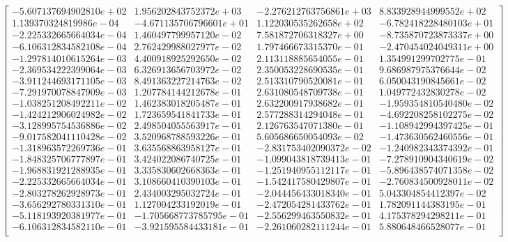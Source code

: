 \documentclass{article}
\begin{document}
$$
\begin{bmatrix} 
-5.607137694902810e+02 & 1.956202843752372e+03 & -2.276212763756861e+03 & 8.833928944999552e+02 \\
1.139370324819986e-04 & -4.671135706796601e+01 & 1.122030535262658e+02 & -6.782418228480103e+01 \\
-2.225332665664034e-04 & 1.460497799957120e-02 & 7.581872706318327e+00 & -8.735870723873337e+00 \\
-6.106312834582108e-04 & 2.762429988027977e-02 & 1.797466673315370e-01 & -2.470454024049311e+00 \\
-1.297814010615264e-03 & 4.400918925292650e-02 & 2.113118885654055e-01 & 1.354991299702775e-01 \\
-2.369534222399064e-03 & 6.326913656703972e-02 & 2.350053228690535e-01 & 9.686987975376644e-02 \\
-3.911244693171105e-03 & 8.491363227214763e-02 & 2.513310790520081e-01 & 6.050043190845661e-02 \\
-7.291970078847909e-03 & 1.207784144212678e-01 & 2.631080548709738e-01 & 1.049772432830278e-02 \\
-1.038251208492211e-02 & 1.462383018205487e-01 & 2.632200917938682e-01 & -1.959354810540480e-02 \\
-1.424212906024982e-02 & 1.723659541841733e-01 & 2.577288314294048e-01 & -4.692208258102275e-02 \\
-3.128995754536886e-02 & 2.498504055563917e-01 & 2.126763547071380e-01 & -1.108942994397425e-01 \\
-9.017582041110428e-02 & 3.520968788593226e-01 & 5.605686650054093e-02 & -1.473630562460556e-01 \\
-1.318963572269736e-01 & 3.635568863958127e-01 & -2.831753402090372e-02 & -1.240982343374392e-01 \\
-1.848325706777897e-01 & 3.424022086740725e-01 & -1.099043818739413e-01 & -7.278910904340619e-02 \\
-1.968831921288935e-01 & 3.335830602668363e-01 & -1.251940955112117e-01 & -5.896438574071358e-02 \\
-2.225332665664034e-01 & 3.108660410390103e-01 & -1.542417580429807e-01 & -2.760834500928011e-02 \\
-2.803278262928973e-01 & 2.434003295032724e-01 & -2.044456433018340e-01 & 5.043304854412397e-02 \\
-3.656292780331310e-01 & 1.127004233192019e-01 & -2.472054281433762e-01 & 1.782091144383195e-01 \\
-5.118193920381977e-01 & -1.705668773785795e-01 & -2.556299463550832e-01 & 4.175378294298211e-01 \\
-6.106312834582110e-01 & -3.921595584433181e-01 & -2.261060282111244e-01 & 5.880648466528077e-01 \\
\end{bmatrix}
$$
\end{document}
